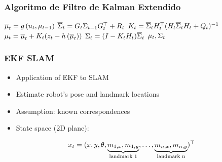 \begin{frame}
    \frametitle{Algoritmo de Filtro de Kalman Extendido}
    
    \begin{algorithmic}[1]
        \State $\overline{\mu}_{t} = g\left( u_{t}, \mu_{t-1} \right)$
        \State $\overline{\Sigma}_{t} = G_{t} \Sigma_{t-1} G_{t}^{\top}+R_{t}$
        \Statex
        \State $K_{t} = \overline{\Sigma}_{t} H_{t}^{\top} (H_{t} \overline{\Sigma}_{t}  H_{t} + Q_{t})^{-1} $
        \State $\mu_{t} = \overline{\mu}_{t} + K_{t} (z_{t} - h\left( \overline{\mu}_{t} \right))$
        \State $\Sigma_{t} =  (I - K_{t} H_{t}) \overline{\Sigma}_{t}$
        \State \Return $\mu_{t}, \Sigma_{t}$
    \EndProcedure
    \end{algorithmic}
\end{frame}

\begin{frame}
    \frametitle{EKF SLAM}

    \begin{itemize}
        \item Application of EKF to SLAM
        \item Estimate robot's pose and landmark locations
        \item Assumption: known correspondences
        \item State space (2D plane):
    \end{itemize}
    \[ x_t = (x, y, \theta, \underbrace{m_{1,x}, m_{1,y}}_{\text{landmark 1}}, \ldots, \underbrace{m_{n,x}, m_{n,y}}_{\text{landmark n}} )^{\top} \]
\end{frame}

